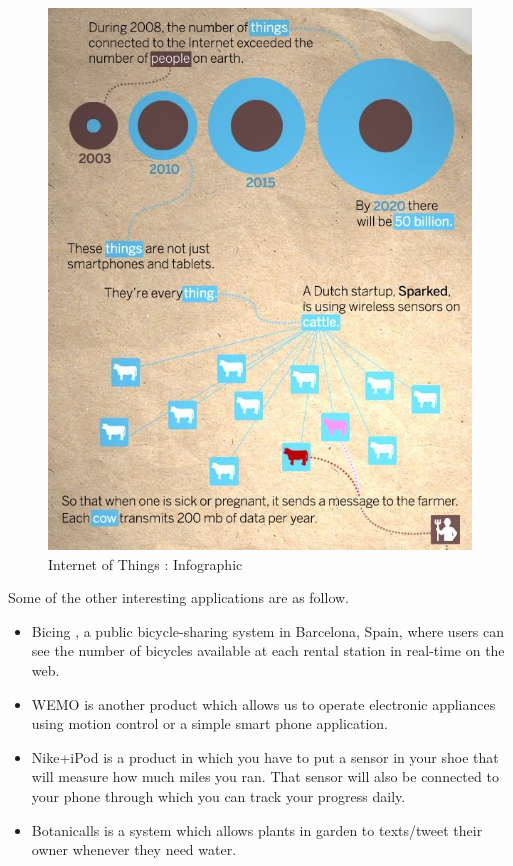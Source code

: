 \documentclass [a4paper,12pt]{book}
\begin{document}
\vspace{0.5cm}
\begin{figure}[!h]
\begin{center}
\includegraphics[scale=0.55]{images/2.png}
\caption{Internet of Things : Infographic \cite{image_cisco}}
\label{cisco}
\end{center}
\end{figure}

Some of the other interesting applications are as follow.
\begin{itemize}
\item Bicing \cite{3}, a public bicycle-sharing system in Barcelona, Spain, where users can see the number of bicycles available at each rental station in real-time on the web.
\item WEMO \cite{4} is another product which allows us to operate electronic appliances using motion control or a simple smart phone application.
\item Nike+iPod \cite{5} is a product in which you have to put a sensor in your shoe that will measure how much miles you ran. That sensor will also be connected to your phone through which you can track your progress daily.
\item Botanicalls\cite{6} is a system which allows plants in garden to texts/tweet their owner whenever they need water.
\end{itemize}
\end{document}
